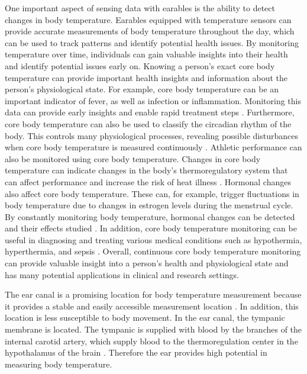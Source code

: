 One important aspect of sensing data with earables is the ability to detect changes in body temperature. 
Earables equipped with temperature sensors can provide accurate measurements of body temperature throughout the day, which can be used to track patterns and identify potential health issues. 
By monitoring temperature over time, individuals can gain valuable insights into their health and identify potential issues early on.
Knowing a person's exact core body temperature can provide important health insights and information about the person's physiological state.
For example, core body temperature can be an important indicator of fever, as well as infection or inflammation. 
Monitoring this data can provide early insights and enable rapid treatment steps \cite{NovelWearableDevice2021}.
Furthermore, core body temperature can also be used to classify the circadian rhythm of the body. 
This controls many physiological processes, revealing possible disturbances when core body temperature is measured continuously \cite{liCircadianRhythmAnalysis2021, juSleepQualityPreclinical2013}.
Athletic performance can also be monitored using core body temperature. Changes in core body temperature can indicate changes in the body's thermoregulatory system that can affect performance and increase the risk of heat illness \cite{gabbettAthleteMonitoringCycle2017, silvaSleepQualityTraining2022}.
Hormonal changes also affect core body temperature. 
These can, for example, trigger fluctuations in body temperature due to changes in estrogen levels during the menstrual cycle. 
By constantly monitoring body temperature, hormonal changes can be detected and their effects studied \cite{goeckenjanContinuousBodyTemperature2020, charkoudianAutonomicControlBody2017, hamataniEstimatingCoreBody2015}.
In addition, core body temperature monitoring can be useful in diagnosing and treating various medical conditions such as hypothermia, hyperthermia, and sepsis \cite{hardingTemperatureDependenceSleep2019, Doi101016, raymannSkinDeepEnhanced2008}.
Overall, continuous core body temperature monitoring can provide valuable insight into a person's health and physiological state and has many potential applications in clinical and research settings.

The ear canal is a promising location for body temperature measurement because it provides a stable and easily accessible measurement location \cite{ericksonComparisonEarbasedBladder1993}.
In addition, this location is less susceptible to body movement. 
In the ear canal, the tympanic membrane is located.
The tympanic is supplied with blood by the branches of the internal carotid artery, which supply blood to the thermoregulation center in the hypothalamus of the brain \cite{moranCoreTemperatureMeasurement2002a}.
Therefore the ear provides high potential in measuring body temperature.

